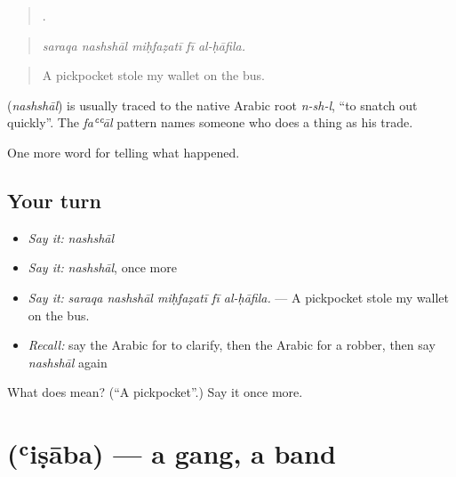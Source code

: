 \begin{quote}
    .
\end{quote}

\begin{quote}
\emph{saraqa nashshāl miḥfaẓatī fī al-ḥāfila.}
\end{quote}

\begin{quote}
A pickpocket stole my wallet on the bus.
\end{quote}

\begin{cousinweb}
\textbf{} (\emph{nashshāl}) is usually traced to the native Arabic root \emph{n-sh-l}, \textquotedblleft{}to snatch out quickly\textquotedblright{}. The \emph{faʿʿāl} pattern names someone who does a thing as his trade.
\end{cousinweb}

\begin{grammarlens}[title={What you've built}]
One more word for telling what happened.
\end{grammarlens}

\subsection*{Your turn}
\begin{itemize}
\raggedright
  \item \emph{Say it:} \emph{nashshāl}
  \item \emph{Say it:} \emph{nashshāl}, once more
  \item \emph{Say it:} \emph{saraqa nashshāl miḥfaẓatī fī al-ḥāfila.} — A pickpocket stole my wallet on the bus.
  \item \emph{Recall:} say the Arabic for to clarify, then the Arabic for a robber, then say \emph{nashshāl} again
\end{itemize}

\begin{tcolorbox}[breakable,colback=teal!4,colframe=teal!35!black,title={Before you move on}]
What does  mean? (\textquotedblleft{}A pickpocket\textquotedblright{}.) Say it once more.
\end{tcolorbox}
\section[\texorpdfstring{\ar{عصابة} (ʿiṣāba)}{عصابة (ʿiṣāba)}]{ (ʿiṣāba) — a gang, a band}

